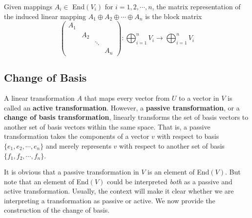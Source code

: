   \begin{theorem}
    Given mappings $A_i \in$ End$(V_i)$ for $i = 1, 2, \cdots, n$, the matrix representation of the induced linear mapping $A_1 \oplus A_2 \oplus \cdots \oplus A_n$ is the block matrix 
    \begin{equation}
      \begin{pmatrix}
      A_1 & & & \\
      & A_2 & & \\
      & & \ddots & \\
      & & & A_n
      \end{pmatrix}: \bigoplus_{i=1}^n V_i \longrightarrow \bigoplus_{i=1}^n V_i
    \end{equation}
  \end{theorem}

\subsection{Change of Basis}

  \begin{definition}
    A linear transformation $A$ that maps every vector from $U$ to a vector in $V$ is called an \textbf{active transformation}. However, a \textbf{passive transformation}, or a \textbf{change of basis transformation}, linearly transforms the set of basis vectors to another set of basis vectors within the same space. That is, a passive transformation takes the components of a vector $v$ with respect to basis $\{e_1, e_2, \cdots, e_n\}$ and merely represents $v$ with respect to another set of basis $\{f_1, f_2, \cdots, f_n\}$. 
  \end{definition}

  It is obvious that a passive transformation in $V$ is an element of End$(V)$. But note that an element of End$(V)$ could be interpreted \textit{both} as a passive and active transformation. Usually, the context will make it clear whether we are interpreting a transformation as passive or active. We now provide the construction of the change of basis. 

